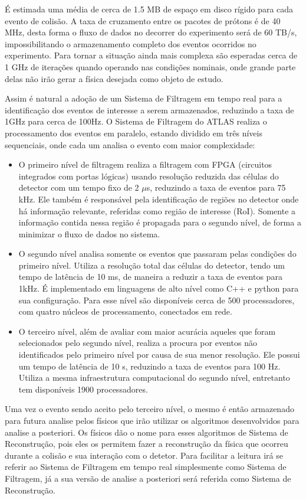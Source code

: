 É estimada uma média de cerca de 1.5 MB de espaço em disco rígido para cada evento de 
colisão. A taxa de cruzamento entre os pacotes de prótons é de 40 MHz, 
desta forma o fluxo de dados no decorrer do experimento será de 60 TB/s, impossibilitando o
armazenamento completo dos eventos ocorridos no experimento. Para tornar a
situação ainda mais complexa são esperadas cerca de 1 GHz de iterações quando
operando nas condições nominais, onde grande parte delas não irão gerar a física
desejada como objeto de estudo.

Assim é natural a adoção de um Sistema de Filtragem em tempo real para a
identificação dos eventos de interesse a serem armazenados, reduzindo a taxa de 1GHz
para cerca de 100Hz. O Sistema de Filtragem do ATLAS realiza o processamento dos 
eventos em paralelo, estando dividido em três níveis sequenciais, onde cada um 
analisa o evento com maior complexidade:

\begin{itemize}
\item O primeiro nível de filtragem realiza a filtragem com FPGA (circuitos
integrados com portas lógicas) usando resolução reduzida das células do detector
com um tempo fixo de 2 $\mu$s, reduzindo a taxa de eventos para
75 kHz. Ele também é responsável pela identificação de regiões no detector onde
há informação relevante, referidas como região de interesse (RoI). Somente a
informação contida nessa região é propagada para o segundo nível, de forma a
minimizar o fluxo de dados no sistema.
\item O segundo nível analisa somente os eventos que passaram pelas condições do
primeiro nível. Utiliza a resolução total das células do detector, 
tendo um tempo de latência de 10 ms, de maneira a reduzir a taxa de eventos para
1kHz. É implementado em linguagens de alto nível como C++ e python para sua configuração. 
Para esse nível são disponíveis cerca de 500 processadores, com quatro
núcleos de processamento, conectados em rede.
\item O terceiro nível, além de avaliar com maior acurácia aqueles que foram
selecionados pelo segundo nível, realiza a procura por eventos não identificados pelo
primeiro nível por causa de sua menor resolução. Ele possui um tempo de 
latência de 10 s, reduzindo a taxa de eventos para 100 Hz. Utiliza a mesma
infraestrutura computacional do segundo nível, entretanto tem disponíveis 1900 processadores.
\end{itemize}

Uma vez o evento sendo aceito pelo terceiro nível, o mesmo é então armazenado
para futura analise pelos físicos que irão utilizar os algoritmos desenvolvidos 
para analise a posteriori. Os físicos dão o nome para esses algoritmos de Sistema de
Reconstrução, pois eles os permitem fazer a reconstrução da física que ocorreu
durante a colisão e sua interação com o detetor. Para facilitar a leitura irá se 
referir ao Sistema de Filtragem em tempo real simplesmente como Sistema de 
Filtragem, já a sua versão de analise a posteriori será referida como Sistema de Reconstrução.

